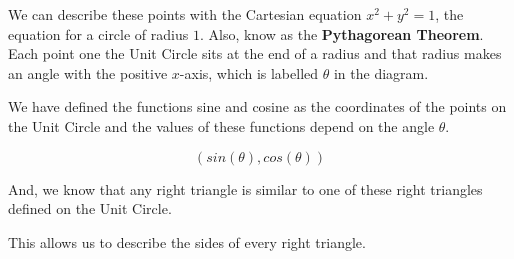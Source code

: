 \documentclass{ximera}
\begin{document}
We can describe these points with the Cartesian equation $x^2 + y^2 = 1$, the equation for a circle of radius $1$. Also, know as the \textbf{Pythagorean Theorem}.\\



Each point one the Unit Circle sits at the end of a radius and that radius makes an angle with the positive $x$-axis, which is labelled $\theta$ in the diagram.




We have defined the functions sine and cosine as the coordinates of the points on the Unit Circle and the values of these functions depend on the angle $\theta$.

\[    ( sin(\theta), cos(\theta) ) \]




And, we know that any right triangle is similar to one of these right triangles defined on the Unit Circle.


This allows us to describe the sides of every right triangle.
\end{document}

